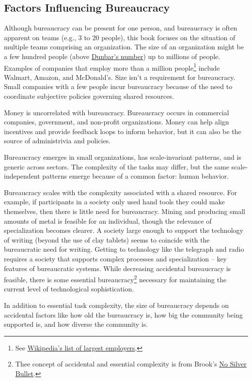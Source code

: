 \subsection*{Factors Influencing Bureaucracy}

Although bureaucracy can be present for one person, and bureaucracy is often apparent on teams (e.g., 3 to 20 people), this book focuses on the situation of multiple teams comprising an organization. The size of an organization might be a few hundred people (above \href{https://en.wikipedia.org/wiki/Dunbar's_number}{Dunbar's number})
 up to millions of people. 
Examples of companies that employ more than a million people\footnote{See \href{https://en.wikipedia.org/wiki/List_of_largest_employers}{Wikipedia's list of largest employers}.
} include Walmart, Amazon, and McDonald's. Size isn't a requirement for bureaucracy. Small companies with a few people incur bureaucracy because of the need to coordinate subjective policies governing shared resources. 

Money is uncorrelated with bureaucracy. Bureaucracy occurs in commercial companies, government, and non-profit organizations. Money can help align incentives and provide feedback loops to inform behavior, but it can also be the source of administrivia and policies. 

Bureaucracy emerges in small organizations, has scale-invariant patterns, and is generic across sectors. The complexity of the tasks may differ, but the same scale-independent patterns  emerge because of a common factor: human behavior.

Bureaucracy scales with the complexity associated with a shared resource. For example, if participants in a society only used hand tools they could make themselves, then there is little need for bureaucracy. Mining and producing small amounts of metal is feasible for an individual, though the relevance of specialization becomes clearer. A society large enough to support the technology of writing (beyond the use of clay tablets) seems to coincide with the bureaucratic need for writing. Getting to technology like the telegraph and radio requires a society that supports complex processes and specialization -- key features of bureaucratic systems. While decreasing accidental bureaucracy is feasible, there is some essential bureaucracy\footnote{Thee concept of accidental and essential complexity is from Brook's \href{https://en.wikipedia.org/wiki/No_Silver_Bullet\#Summary}{No Silver Bullet}.
} necessary for maintaining the current level of technological sophistication. 


In addition to essential task complexity, the size of bureaucracy depends on accidental factors like how old the bureaucracy is, how big the community being supported is, and how diverse the community is.


